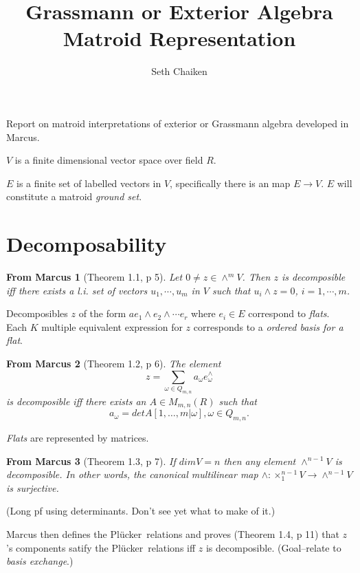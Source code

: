 \documentclass{amsart}
\title{Grassmann or Exterior Algebra Matroid Representation}
\author{Seth Chaiken}
\newtheorem{MRes}{From Marcus}
\begin{document}
\newcommand{\matroidconcept}[1]{\emph{#1}}
\newcommand{\Plucker}{Pl\"{u}cker\ }


\maketitle


Report on matroid interpretations of exterior or Grassmann
algebra developed in Marcus\cite{MarcusFDMuAlPt2}.

$V$ is a finite dimensional vector space over field $R$.

$E$ is a finite set of labelled vectors in $V$, specifically there
is an map $E\rightarrow V$.   $E$ will constitute a matroid
\matroidconcept{ground set}.

\section{Decomposability}

\begin{MRes}[Theorem 1.1, p 5]
  Let $0\neq z \in \wedge^m V$.  Then $z$ is decomposible iff there
  exists a l.i. set of vectors $u_1, \cdots, u_m$ in $V$ such that
  $u_i \wedge z = 0$, $i = 1, \cdots, m$.
\end{MRes}

Decomposibles $z$ of the form $a e_1 \wedge e_2 \wedge \cdots e_r$ where
$e_i\in E$ correspond to \matroidconcept{flats}.
Each $K$ multiple equivalent expression for $z$ corresponds to a
\matroidconcept{ordered basis for a flat}.

\begin{MRes}[Theorem 1.2, p 6]
  The element
  \[
  z = \sum_{\omega\in Q_{m,n}}a_\omega e^{\wedge}_\omega
  \]
  is decomposible iff there exists an $A\in M_{m,n}(R)$ such that
  \[
  a_\omega = det A[1,\dots,m|\omega], \omega\in Q_{m,n}.
  \]
\end{MRes}

\matroidconcept{Flats} are represented by matrices.

\begin{MRes}[Theorem 1.3, p 7]
  If $dim V = n$ then any element $\wedge^{n-1}V$ is decomposible.
  In other words, the canonical multilinear map
  $\wedge:\times_1^{n-1} V \rightarrow \wedge^{n-1} V$ is surjective.
\end{MRes}

(Long pf using determinants.  Don't see yet what to make of it.)

Marcus then defines the \Plucker relations and proves (Theorem 1.4, p 11)
that $z$'s components satify the \Plucker relations iff $z$ is decomposible.
(Goal--relate to \matroidconcept{basis exchange}.)
\end{document}
